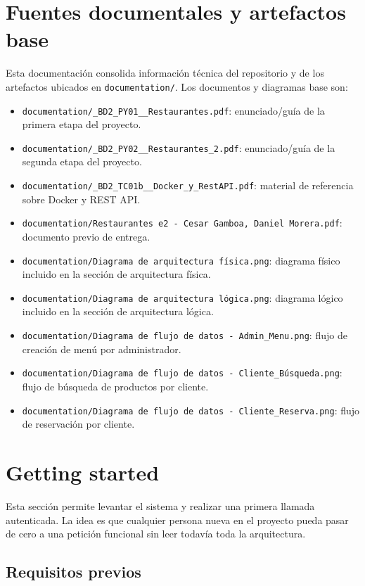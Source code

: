 \documentclass[12pt,letterpaper]{article}
\def\codefile#1{\nolinkurl{#1}}
\begin{document}
\section{Fuentes documentales y artefactos base}

Esta documentación consolida información técnica del repositorio y de los artefactos ubicados en \codefile{documentation/}. Los documentos y diagramas base son:

\begin{itemize}
    \item \codefile{documentation/\_BD2\_PY01\_\_Restaurantes.pdf}: enunciado/guía de la primera etapa del proyecto.
    \item \codefile{documentation/\_BD2\_PY02\_\_Restaurantes\_2.pdf}: enunciado/guía de la segunda etapa del proyecto.
    \item \codefile{documentation/\_BD2\_TC01b\_\_Docker\_y\_RestAPI.pdf}: material de referencia sobre Docker y REST API.
    \item \codefile{documentation/Restaurantes e2 - Cesar Gamboa, Daniel Morera.pdf}: documento previo de entrega.
    \item \codefile{documentation/Diagrama de arquitectura física.png}: diagrama físico incluido en la sección de arquitectura física.
    \item \codefile{documentation/Diagrama de arquitectura lógica.png}: diagrama lógico incluido en la sección de arquitectura lógica.
    \item \codefile{documentation/Diagrama de flujo de datos - Admin\_Menu.png}: flujo de creación de menú por administrador.
    \item \codefile{documentation/Diagrama de flujo de datos - Cliente\_Búsqueda.png}: flujo de búsqueda de productos por cliente.
    \item \codefile{documentation/Diagrama de flujo de datos - Cliente\_Reserva.png}: flujo de reservación por cliente.
\end{itemize}

\section{Getting started}

Esta sección permite levantar el sistema y realizar una primera llamada autenticada. La idea es que cualquier persona nueva en el proyecto pueda pasar de cero a una petición funcional sin leer todavía toda la arquitectura.

\subsection{Requisitos previos}
\end{document}
